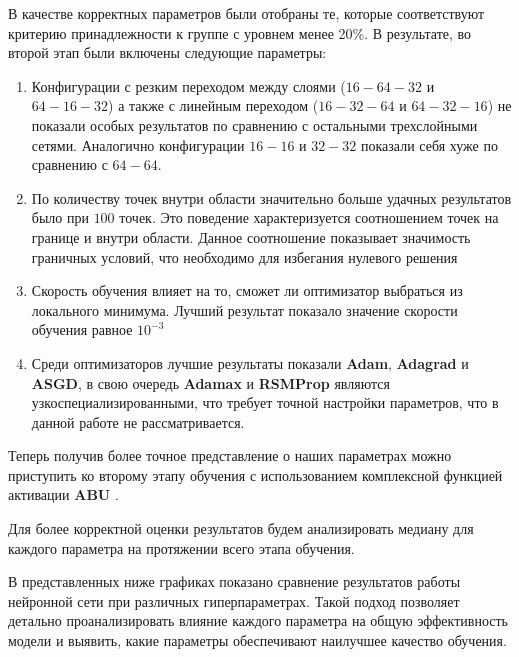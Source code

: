 В качестве корректных параметров были отобраны те, которые соответствуют критерию
принадлежности к группе с уровнем менее 20\%. В результате, во второй этап были
включены следующие параметры:
\begin{enumerate}
    \item Конфигурации с резким переходом между слоями ($16-64-32$ и $64-16-32$) а также
    с линейным переходом ($16-32-64$ и $64-32-16$) не показали особых результатов по
    сравнению с остальными трехслойными сетями. Аналогично конфигурации
    $16-16$ и $32-32$ показали себя хуже по сравнению с $64-64$.
    \item По количеству точек внутри области значительно больше удачных
    результатов было при $100$ точек. Это поведение характеризуется 
    соотношением точек на границе и внутри области. Данное соотношение 
    показывает значимость граничных условий, что необходимо для избегания
    нулевого решения
    \item Скорость обучения влияет на то, сможет ли оптимизатор 
    выбраться из локального минимума. Лучший результат показало значение
    скорости обучения равное $10^{-3}$
    \item Среди оптимизаторов лучшие результаты показали \textbf{Adam}, \textbf{Adagrad} и
    \textbf{ASGD}, в свою очередь \textbf{Adamax} и \textbf{RSMProp} являются узкоспециализированными,
    что требует точной настройки параметров, что в данной работе не рассматривается.
\end{enumerate} 

Теперь получив более точное представление о наших параметрах можно приступить
ко второму этапу обучения с использованием комплексной функцией активации \textbf{ABU} \cite{Sutfeld2018-io}.

Для более корректной оценки результатов будем анализировать медиану для каждого параметра
на протяжении всего этапа обучения.

В представленных ниже графиках показано сравнение результатов работы нейронной сети
при различных гиперпараметрах. Такой подход позволяет детально проанализировать
влияние каждого параметра на общую эффективность модели и выявить, какие параметры
обеспечивают наилучшее качество обучения.



% 
% 
% 